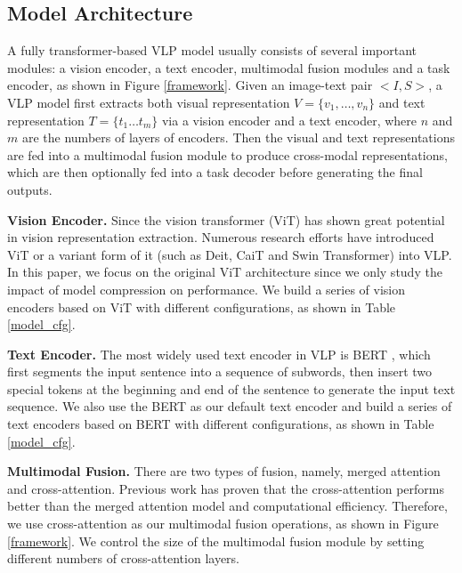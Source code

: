 \documentclass[10pt,twocolumn,letterpaper]{article}
\begin{document}
\subsection{Model Architecture}

A fully transformer-based VLP model usually consists of several important modules: a vision encoder, a text encoder, multimodal fusion modules and a task encoder, as shown in Figure \ref{framework}. Given an image-text pair $ < I, S> $, a VLP model first extracts both visual representation $V=\{ v_1, \dots, v_n \}$ and text representation $ T =\{ t_1 \dots t_m \} $ via a vision encoder and a text encoder, where $n$ and $m$ are the numbers of layers of encoders. Then the visual and text representations are fed into a multimodal fusion module to produce cross-modal representations, which are then optionally fed into a task decoder before generating the final outputs.

\par
\noindent
\textbf{Vision Encoder.} 
Since the vision transformer (ViT) \cite{dosovitskiy2020image} has shown great potential in vision representation extraction. Numerous research efforts \cite{kim2021vilt,li2021align, li2022blip, wang2022image} have introduced ViT or a variant form of it (such as Deit, CaiT and Swin Transformer) into VLP. In this paper, we focus on the original ViT \cite{dosovitskiy2020image} architecture since we only study the impact of model compression on performance. We build a series of vision encoders based on ViT with
different configurations, as shown in Table \ref{model_cfg}.

\par
\noindent
\textbf{Text Encoder.} 
The most widely used text encoder in VLP is BERT \cite{devlin2018bert}, which first segments the input sentence into a sequence of subwords, then insert two special tokens at the beginning and end of the sentence to generate the input text sequence. 
We also use the BERT as our default text encoder and build a series of text encoders based on BERT with
different configurations, as shown in Table \ref{model_cfg}.

\par
\noindent
\textbf{Multimodal Fusion.} 
There are two types of fusion, namely, merged attention and cross-attention. 
Previous work \cite{dou2022empirical} has proven that the cross-attention performs better than the merged attention model and computational efficiency. 
Therefore, we use cross-attention as our multimodal fusion operations, as shown in Figure \ref{framework}.
We control the size of the multimodal fusion module by setting different numbers of cross-attention layers.
\end{document}
